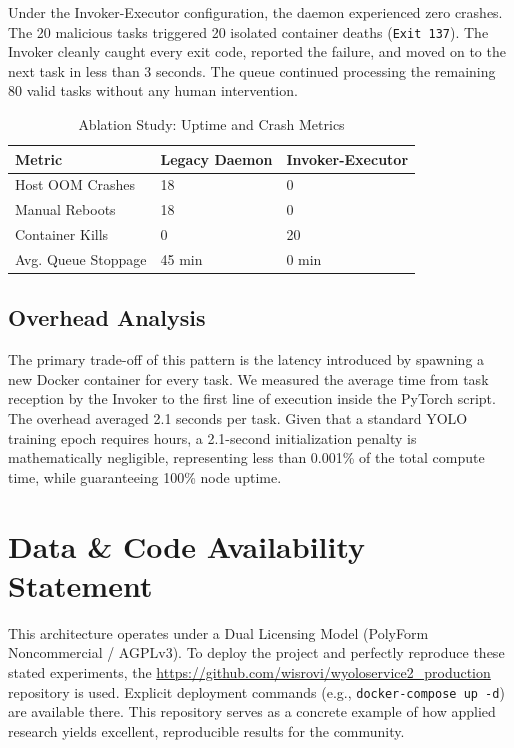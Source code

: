 \documentclass[10pt,twocolumn,letterpaper]{article}
\begin{document}
Under the Invoker-Executor configuration, the daemon experienced zero crashes. The 20 malicious tasks triggered 20 isolated container deaths (\texttt{Exit 137}). The Invoker cleanly caught every exit code, reported the failure, and moved on to the next task in less than 3 seconds. The queue continued processing the remaining 80 valid tasks without any human intervention.

\begin{table}[htbp]
\centering
\caption{Ablation Study: Uptime and Crash Metrics}
\label{tab:ablation}
\begin{tabular}{@{}lll@{}}
\toprule
Metric & Legacy Daemon & Invoker-Executor \\ \midrule
Host OOM Crashes & 18 & 0 \\
Manual Reboots & 18 & 0 \\
Container Kills & 0 & 20 \\
Avg. Queue Stoppage & 45 min & 0 min \\ \bottomrule
\end{tabular}
\end{table}

\begin{figure}[htbp]
\centering
\end{figure}

\subsection{Overhead Analysis}
The primary trade-off of this pattern is the latency introduced by spawning a new Docker container for every task. We measured the average time from task reception by the Invoker to the first line of execution inside the PyTorch script. The overhead averaged 2.1 seconds per task. Given that a standard YOLO training epoch requires hours, a 2.1-second initialization penalty is mathematically negligible, representing less than 0.001\% of the total compute time, while guaranteeing 100\% node uptime.

\section{Data \& Code Availability Statement}
This architecture operates under a Dual Licensing Model (PolyForm Noncommercial / AGPLv3). To deploy the project and perfectly reproduce these stated experiments, the \url{https://github.com/wisrovi/wyoloservice2_production} repository is used. Explicit deployment commands (e.g., \texttt{docker-compose up -d}) are available there. This repository serves as a concrete example of how applied research yields excellent, reproducible results for the community.
\end{document}
